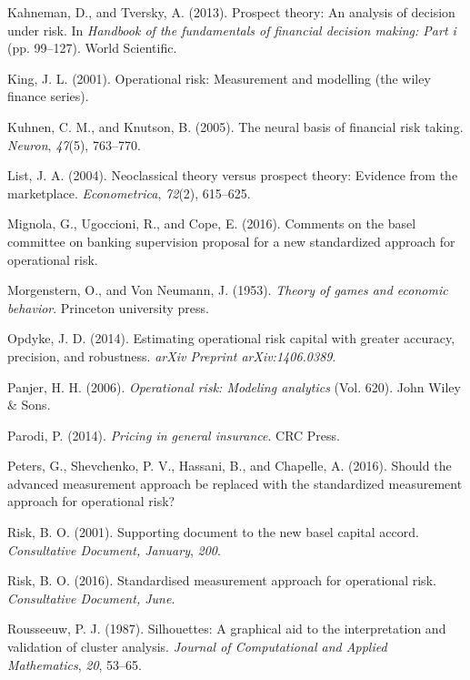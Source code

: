 \documentclass[]{DissertateUSU}
\begin{document}
\hypertarget{ref-kahneman2013prospect}{}
Kahneman, D., and Tversky, A. (2013). Prospect theory: An analysis of
decision under risk. In \emph{Handbook of the fundamentals of financial
decision making: Part i} (pp. 99--127). World Scientific.

\hypertarget{ref-king2001operational}{}
King, J. L. (2001). Operational risk: Measurement and modelling (the
wiley finance series).

\hypertarget{ref-kuhnen2005neural}{}
Kuhnen, C. M., and Knutson, B. (2005). The neural basis of financial
risk taking. \emph{Neuron}, \emph{47}(5), 763--770.

\hypertarget{ref-list2004neoclassical}{}
List, J. A. (2004). Neoclassical theory versus prospect theory: Evidence
from the marketplace. \emph{Econometrica}, \emph{72}(2), 615--625.

\hypertarget{ref-mignola2016comments}{}
Mignola, G., Ugoccioni, R., and Cope, E. (2016). Comments on the basel
committee on banking supervision proposal for a new standardized
approach for operational risk.

\hypertarget{ref-morgenstern1953theory}{}
Morgenstern, O., and Von Neumann, J. (1953). \emph{Theory of games and
economic behavior}. Princeton university press.

\hypertarget{ref-opdyke2014estimating}{}
Opdyke, J. D. (2014). Estimating operational risk capital with greater
accuracy, precision, and robustness. \emph{arXiv Preprint
arXiv:1406.0389}.

\hypertarget{ref-panjer2006operational}{}
Panjer, H. H. (2006). \emph{Operational risk: Modeling analytics} (Vol.
620). John Wiley \& Sons.

\hypertarget{ref-parodi2014pricing}{}
Parodi, P. (2014). \emph{Pricing in general insurance}. CRC Press.

\hypertarget{ref-peters2016should}{}
Peters, G., Shevchenko, P. V., Hassani, B., and Chapelle, A. (2016).
Should the advanced measurement approach be replaced with the
standardized measurement approach for operational risk?

\hypertarget{ref-risk2001supporting}{}
Risk, B. O. (2001). Supporting document to the new basel capital accord.
\emph{Consultative Document, January}, \emph{200}.

\hypertarget{ref-risk2016supporting}{}
Risk, B. O. (2016). Standardised measurement approach for operational
risk. \emph{Consultative Document, June}.

\hypertarget{ref-rousseeuw1987silhouettes}{}
Rousseeuw, P. J. (1987). Silhouettes: A graphical aid to the
interpretation and validation of cluster analysis. \emph{Journal of
Computational and Applied Mathematics}, \emph{20}, 53--65.
\end{document}
